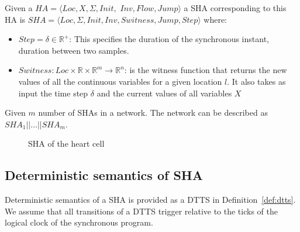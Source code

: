 \begin{definition}
	Given a 
	$HA = \langle Loc, X, \Sigma, Init,$ $ Inv, Flow, Jump \rangle$ a \ac{SHA} corresponding to
	this \ac{HA} is \newline
	$SHA = \langle Loc,  \Sigma, Init, Inv, Switness, Jump, Step \rangle$ where:
	\begin{itemize}
		\item $Step = \delta \in \mathbb{R}^+$: This specifies the duration of the synchronous instant,  duration between 
		two samples.
		\item
		$Switness: Loc \times \mathbb{R} \times
		\mathbb{R}^m \rightarrow \mathbb{R}^n$:
		is the witness function that returns the new values of all the
		continuous variables for a given location $l$.
		It also takes as input the time step $\delta$ and the current values of all variables $X$
	\end{itemize}
	\label{def:sha}
\end{definition}

Given  $m$   number of \acp{SHA} in a network.
The network can be described as $SHA_1 || \dots || SHA_m$.

\begin{figure}
	\centering
	
	\caption{\acf{SHA} of the heart cell \label{fig:heartCellSHA}}
\end{figure}

\subsection{Deterministic semantics of \ac{SHA}}
\label{sec:DTTS}
Deterministic semantics of a \ac{SHA} is provided as a \acf{DTTS} in
Definition~\ref{def:dtts}. We assume that all transitions of a \acf{DTTS}
trigger relative to the ticks of the logical clock of the synchronous
program.

